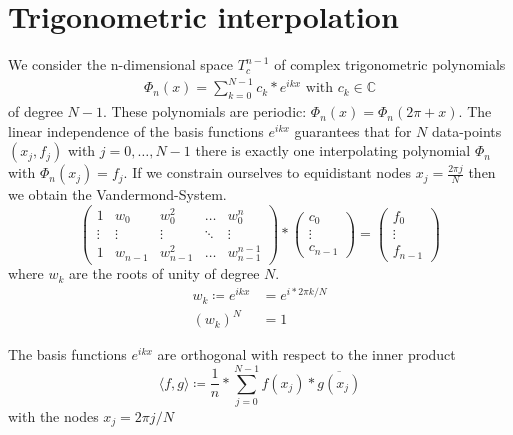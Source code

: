 \chapter{Trigonometric interpolation}\label{ch:trigonometric-interpolation}
We consider the n-dimensional space $T_c^{n-1}$ of complex trigonometric polynomials
\begin{align*}
    \Phi_n(x) = \sum_{k=0}^{N-1} c_k * e^{ikx} \text{ with } c_k \in \mathbb{C}
\end{align*}
of degree $N-1$.
These polynomials are periodic: $\Phi_n(x)=\Phi_n(2 \pi + x)$.
The linear independence of the basis functions $e^{ikx}$ guarantees that for $N$ data-points $(x_j, f_j)$ with $j= 0, \ldots, N-1$ there is exactly
one interpolating polynomial $\Phi_n$ with $\Phi_n(x_j)=f_j$.
If we constrain ourselves to equidistant nodes $x_j = \frac{2  \pi j}{N}$ then we obtain the Vandermond-System.
\begin{equation*}
    \begin{pmatrix}
        1      & w_0     & w_0^2     & \dots  & w_0^n         \\
        \vdots & \vdots  & \vdots    & \ddots & \vdots        \\
        1      & w_{n-1} & w_{n-1}^2 & \dots  & w_{n-1}^{n-1}
    \end{pmatrix}
    *
    \begin{pmatrix*}
        c_0\\
        \vdots \\
        c_{n-1}
    \end{pmatrix*}
    =
    \begin{pmatrix*}
        f_0\\
        \vdots\\
        f_{n-1}
    \end{pmatrix*}
\end{equation*}
where $w_k$ are the roots of unity of degree $N$.
\begin{align*}
    w_k \coloneq e^{ikx} &= e^{i*2 \pi k / N}\\
    (w_k)^N &= 1
\end{align*}
\begin{lemma}
    The basis functions $e^{ikx}$ are orthogonal with respect to the inner product
    \begin{equation*}
        \langle f, g \rangle \coloneq \frac{1}{n} * \sum_{j=0}^{N-1} f(x_j) * \overline{g(x_j)}
    \end{equation*}
    with the nodes $x_j = {2\pi j}/{N}$
\end{lemma}
